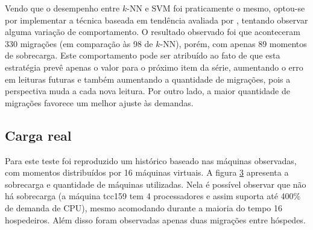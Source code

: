 \begin{figure}[htp]
\centering
{}
\label{fig:cpuhost0}
\end{figure}

Vendo que o desempenho entre $k$-NN e SVM foi praticamente o mesmo, optou-se por
implementar a técnica baseada em tendência avaliada por
, tentando observar alguma variação de
comportamento. O resultado observado foi que aconteceram 330 migrações (em
comparação às 98 de $k$-NN), porém, com apenas 89 momentos de sobrecarga. Este
comportamento pode ser atribuído ao fato de que esta estratégia prevê apenas o
valor para o próximo item da série, aumentando o erro em leituras futuras e
também aumentando a quantidade de migrações, pois a perspectiva muda a cada nova
leitura. Por outro lado, a maior quantidade de migrações favorece um melhor
ajuste às demandas.

\begin{figure}[htp]
\centering
{}
\label{fig:cpuhost0}
\end{figure}

\subsection{Carga real}

Para este teste foi reproduzido um histórico baseado nas máquinas observadas,
com momentos distribuídos por 16 máquinas virtuais. A figura \ref{fig:cpuhost1}
apresenta a sobrecarga e quantidade de máquinas utilizadas. Nela é possível
observar que não há sobrecarga (a máquina tcc159 tem 4 processadores e assim
suporta até 400\% de demanda de CPU), mesmo acomodando durante a maioria do
tempo 16 hospedeiros. Além disso foram observadas apenas duas migrações entre
hóspedes.

\begin{figure}[htp]
\centering
{}
\label{fig:cpuhost1}
\end{figure}

